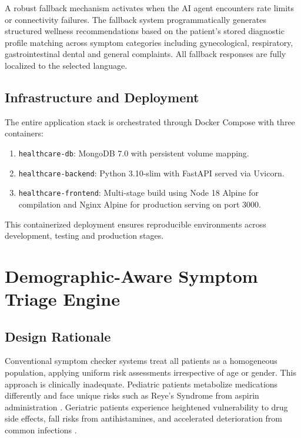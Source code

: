 \documentclass[conference]{IEEEtran}
\begin{document}
A robust fallback mechanism activates when the AI agent encounters rate limits or connectivity failures. The fallback system programmatically generates structured wellness recommendations based on the patient's stored diagnostic profile matching across symptom categories including gynecological, respiratory, gastrointestinal dental and general complaints. All fallback responses are fully localized to the selected language.

\subsection{Infrastructure and Deployment}

The entire application stack is orchestrated through Docker Compose with three containers:

\begin{enumerate}
\item \texttt{healthcare-db}: MongoDB 7.0 with persistent volume mapping.
\item \texttt{healthcare-backend}: Python 3.10-slim with FastAPI served via Uvicorn.
\item \texttt{healthcare-frontend}: Multi-stage build using Node 18 Alpine for compilation and Nginx Alpine for production serving on port 3000.
\end{enumerate}

This containerized deployment ensures reproducible environments across development, testing and production stages.

\section{Demographic-Aware Symptom Triage Engine}

\subsection{Design Rationale}

Conventional symptom checker systems treat all patients as a homogeneous population, applying uniform risk assessments irrespective of age or gender. This approach is clinically inadequate. Pediatric patients metabolize medications differently and face unique risks such as Reye's Syndrome from aspirin administration \cite{b15}. Geriatric patients experience heightened vulnerability to drug side effects, fall risks from antihistamines, and accelerated deterioration from common infections \cite{b16}.
\end{document}
